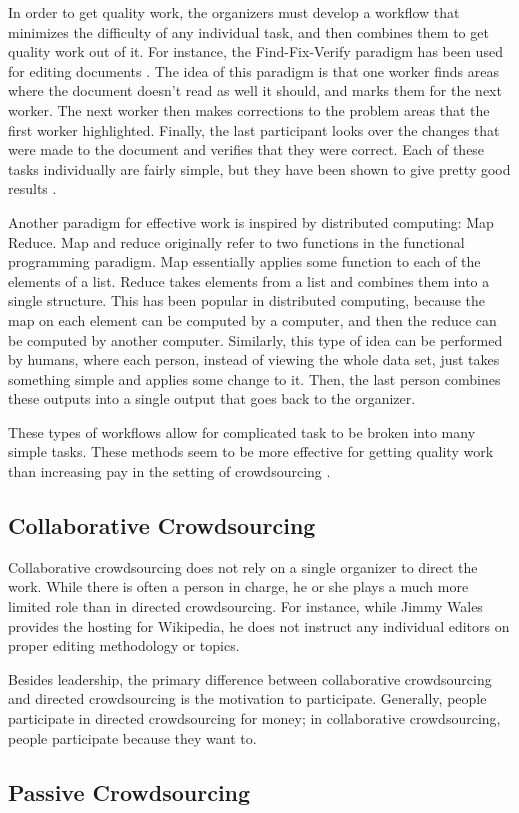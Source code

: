 In order to get quality work, the organizers must develop a workflow that minimizes the difficulty of any individual task, and then combines them to get quality work out of it. For instance, the Find-Fix-Verify paradigm has been used for editing documents \cite{crowdsourcing}. The idea of this paradigm is that one worker finds areas where the document doesn't read as well it should, and marks them for the next worker. The next worker then makes corrections to the problem areas that the first worker highlighted. Finally, the last participant looks over the changes that were made to the document and verifies that they were correct. Each of these tasks individually are fairly simple, but they have been shown to give pretty good results \cite{crowdsourcing}. 

Another paradigm for effective work is inspired by distributed computing: Map Reduce. Map and reduce originally refer to two functions in the functional programming paradigm. Map essentially applies some function to each of the elements of a list. Reduce takes elements from a list and combines them into a single structure. This has been popular in distributed computing, because the map on each element can be computed by a computer, and then the reduce can be computed by another computer. Similarly, this type of idea can be performed by humans, where each person, instead of viewing the whole data set, just takes something simple and applies some change to it. Then, the last person combines these outputs into a single output that goes back to the organizer.

These types of workflows allow for complicated task to be broken into many simple tasks. These methods seem to be more effective for getting quality work than increasing pay in the setting of crowdsourcing \cite{crowdsourcing}.

\subsection{Collaborative Crowdsourcing}
Collaborative crowdsourcing does not rely on a single organizer to direct the work. While there is often a person in charge, he or she plays a much more limited role than in directed crowdsourcing. For instance, while Jimmy Wales provides the hosting for Wikipedia, he does not instruct any individual editors on proper editing methodology or topics.

Besides leadership, the primary difference between collaborative crowdsourcing and directed crowdsourcing is the motivation to participate. Generally, people participate in directed crowdsourcing for money; in collaborative crowdsourcing, people participate because they want to. 

\subsection{Passive Crowdsourcing}
